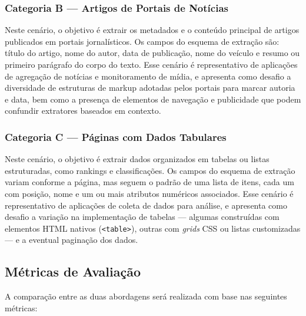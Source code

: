 \documentclass[tcc,capa]{texifsul}
\begin{document}
\subsubsection*{Categoria B — Artigos de Portais de Notícias}

Neste cenário, o objetivo é extrair os metadados e o conteúdo principal de artigos publicados em portais jornalísticos. Os campos do esquema de extração são: título do artigo, nome do autor, data de publicação, nome do veículo e resumo ou primeiro parágrafo do corpo do texto. Esse cenário é representativo de aplicações de agregação de notícias e monitoramento de mídia, e apresenta como desafio a diversidade de estruturas de markup adotadas pelos portais para marcar autoria e data, bem como a presença de elementos de navegação e publicidade que podem confundir extratores baseados em contexto.

\subsubsection*{Categoria C — Páginas com Dados Tabulares}

Neste cenário, o objetivo é extrair dados organizados em tabelas ou listas estruturadas, como rankings e classificações. Os campos do esquema de extração variam conforme a página, mas seguem o padrão de uma lista de itens, cada um com posição, nome e um ou mais atributos numéricos associados. Esse cenário é representativo de aplicações de coleta de dados para análise, e apresenta como desafio a variação na implementação de tabelas — algumas construídas com elementos HTML nativos (\texttt{<table>}), outras com \textit{grids} CSS ou listas customizadas — e a eventual paginação dos dados.

\subsection{Métricas de Avaliação}

A comparação entre as duas abordagens será realizada com base nas seguintes métricas:
\end{document}
